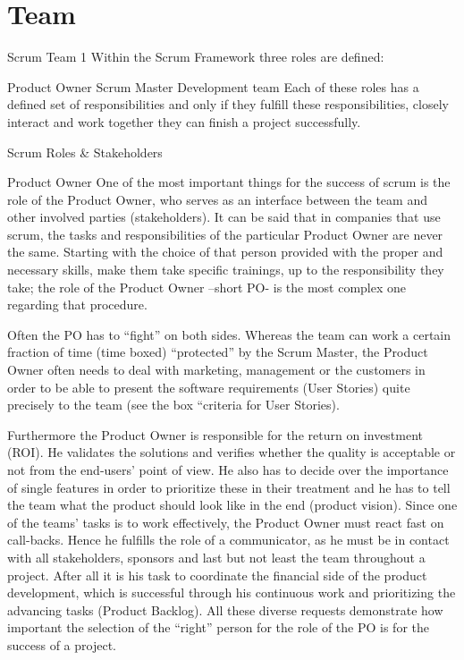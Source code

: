 \section{Team}

Scrum Team 1
Within the Scrum Framework three roles are defined:

Product Owner
Scrum Master
Development team
Each of these roles has a defined set of responsibilities and only if they fulfill these responsibilities, closely interact and work together they can finish a project successfully.

 Scrum Roles & Stakeholders

Product Owner
One of the most important things for the success of scrum is the role of the Product Owner, who serves as an interface between the team and other involved parties (stakeholders). It can be said that in companies that use scrum, the tasks and responsibilities of the particular Product Owner are never the same. Starting with the choice of that person provided with the proper and necessary skills, make them take specific trainings, up to the responsibility they take; the role of the Product Owner –short PO- is the most complex one regarding that procedure.

Often the PO has to “fight” on both sides. Whereas the team can work a certain fraction of time (time boxed) “protected” by the Scrum Master, the Product Owner often needs to deal with marketing, management or the customers in order to be able to present the software requirements (User Stories) quite precisely to the team (see the box “criteria for User Stories).

Furthermore the Product Owner is responsible for the return on investment (ROI). He validates the solutions and verifies whether the quality is acceptable or not from the end-users’ point of view. He also has to decide over the importance of single features in order to prioritize these in their treatment and he has to tell the team what the product should look like in the end (product vision). Since one of the teams’ tasks is to work effectively, the Product Owner must react fast on call-backs. Hence he fulfills the role of a communicator, as he must be in contact with all stakeholders, sponsors and last but not least the team throughout a project. After all it is his task to coordinate the financial side of the product development, which is successful through his continuous work and prioritizing the advancing tasks (Product Backlog). All these diverse requests demonstrate how important the selection of the “right” person for the role of the PO is for the success of a project.


